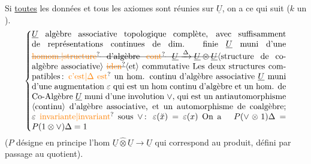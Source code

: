 Si \uline{toutes} les données et tous les axiomes sont
réunies sur $\underline U$, on a ce qui suit ($k$ un ).
\[
\left\{\vcenter{\hbox{\begin{minipage}{0.88\linewidth}
$\underline U$ algèbre associative topologique complète, avec suffisamment de représentations continues de dim. finie

$\underline U$ muni d'une \deleted{\unsure{homom.|structure} d'algèbre \unsure{cont} $\underline U\xrightarrow{\Delta}\underline U\otimes\underline U$}\inserted{structure de co-algèbre associative} \deleted{\unsure{iden}}\inserted{et} commutative

Les deux structures compatibles\,: \unsure{c'est|$\Delta$ est} un hom. continu d'algèbre associative

$\underline U$ muni d'une augmentation $\varepsilon$ qui est un hom continu d'algèbre et un hom. de Co-Algèbre

$\underline U$ muni d'une involution $\vee$, qui est un antiautomorphisme \inserted{continu} d'algèbre associative, et un automorphisme de coalgèbre;

$\varepsilon$ \unsure{invariante|invariant} sous $\vee$\,: $\varepsilon(\breve x)=\varepsilon(x)$

On a \quad $P(\vee\otimes1)\Delta=P(1\otimes\vee)\Delta=1$
\end{minipage}}}\right.
\]
($P$ désigne en principe l'hom $\underline U\mathbin{\widehat\otimes}\underline U\longrightarrow\underline U$
qui correspond au produit, 
défini par passage au quotient).

